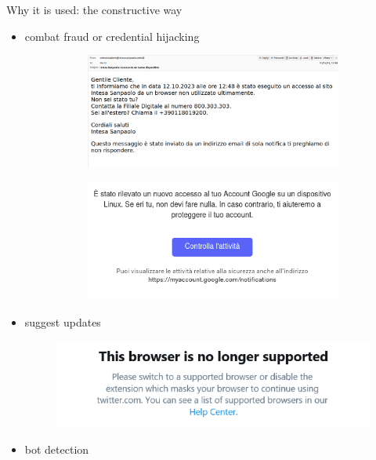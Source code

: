 \begin{frame}{Why it is used: the constructive way}
  \begin{itemize}
    \item combat fraud or credential hijacking
          \begin{figure}
            \centering
            \begin{subfigure}{0.45\textwidth}
              \includegraphics[width=\linewidth]{images/sanpaolo.png}
            \end{subfigure}
            \begin{subfigure}{0.45\textwidth}
              \includegraphics[width=\linewidth]{images/google.png}
            \end{subfigure}
          \end{figure}
    \item suggest updates
          \begin{figure}
            \centering
            \includegraphics[width=0.6\linewidth]{images/update.png}
          \end{figure}
    \item bot detection

\end{itemize}
\end{frame}
